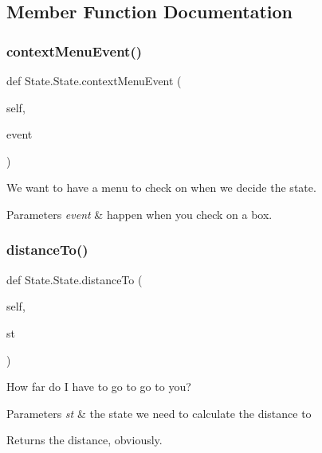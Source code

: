 \subsection{Member Function Documentation}
\mbox{\label{classState_1_1State_aaa419198fa3621653b526f3dab2a9354}} 
\subsubsection{\texorpdfstring{contextMenuEvent()}{contextMenuEvent()}}
{\footnotesize\ttfamily def State.\+State.\+context\+Menu\+Event (\begin{DoxyParamCaption}\item[{}]{self,  }\item[{}]{event }\end{DoxyParamCaption})}



We want to have a menu to check on when we decide the state. 


\begin{DoxyParams}{Parameters}
{\em event} & happen when you check on a box. \\
\hline
\end{DoxyParams}
\mbox{\label{classState_1_1State_a3fb5fb5e2fb8c14daedb424be4d867b3}} 
\subsubsection{\texorpdfstring{distanceTo()}{distanceTo()}}
{\footnotesize\ttfamily def State.\+State.\+distance\+To (\begin{DoxyParamCaption}\item[{}]{self,  }\item[{}]{st }\end{DoxyParamCaption})}



How far do I have to go to go to you? 


\begin{DoxyParams}{Parameters}
{\em st} & the state we need to calculate the distance to \\
\hline
\end{DoxyParams}
\begin{DoxyReturn}{Returns}
the distance, obviously. 
\end{DoxyReturn}
\mbox{\label{classState_1_1State_a3844e06a4d0a60cb9d95cb22b168705e}} 
